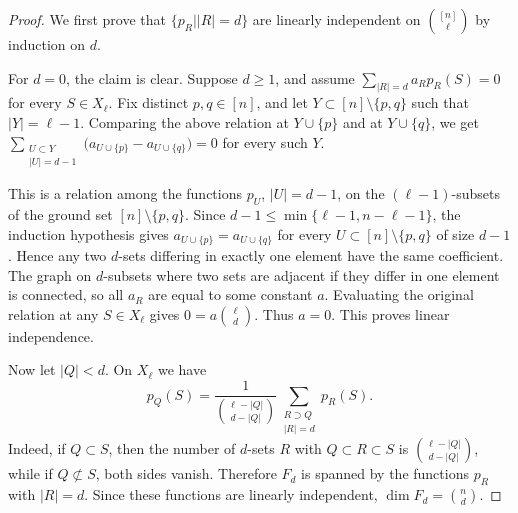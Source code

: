 \documentclass[10pt,a4paper]{amsart}
\newcommand{\X}{X_\ell}
\begin{document}
\begin{proof}
We first prove that $\{p_R | |R|=d\}$ are linearly independent on ${[n] \choose \ell}$ by induction on $d$.

For \(d=0\), the claim is clear. Suppose \(d\ge 1\), and assume $\sum_{|R|=d} a_R p_R(S)=0$
for every \(S\in\X\). Fix distinct \(p,q\in[n]\), and let $Y\subset [n]\setminus\{p,q\}$ such that $|Y|=\ell-1$.
Comparing the above relation at \(Y\cup\{p\}\) and at \(Y\cup\{q\}\), we get $\sum_{\substack{U\subset Y\\ |U|=d-1}}
\bigl(a_{U\cup\{p\}}-a_{U\cup\{q\}}\bigr)=0$
for every such \(Y\).

This is a relation among the functions \(p_U\), \(|U|=d-1\), on the \((\ell-1)\)-subsets of the ground set \([n]\setminus\{p,q\}\). Since
$d-1\le \min\{\ell-1,n-\ell-1\}$,
the induction hypothesis gives $a_{U\cup\{p\}}=a_{U\cup\{q\}}$ for every \(U\subset[n]\setminus\{p,q\}\) of size \(d-1\). Hence any two \(d\)-sets differing in exactly one element have the same coefficient. The graph on \(d\)-subsets where two sets are adjacent if they differ in one element is connected, so all \(a_R\) are equal to some constant \(a\). Evaluating the original relation at any \(S\in\X\) gives $0=a\binom{\ell}{d}$.
Thus \(a=0\). This proves linear independence.

Now let \(|Q|<d\). On \(\X\) we have
\[
p_Q(S)
=
\frac{1}{\binom{\ell-|Q|}{d-|Q|}}
\sum_{\substack{R\supset Q\\ |R|=d}} p_R(S).
\]
Indeed, if \(Q\subset S\), then the number of \(d\)-sets \(R\) with $Q\subset R\subset S$
is \(\binom{\ell-|Q|}{d-|Q|}\), while if \(Q\not\subset S\), both sides vanish. Therefore \(F_d\) is spanned by the functions \(p_R\) with \(|R|=d\). Since these functions are linearly independent, $\dim F_d=\binom nd$.
\end{proof}
\end{document}
